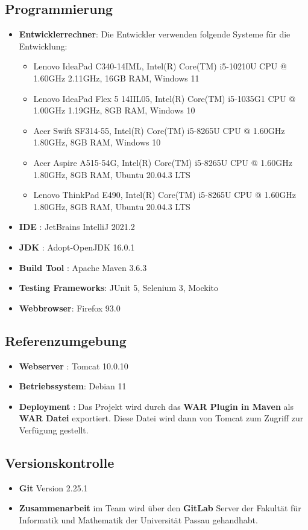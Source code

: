 \subsection{Programmierung}
\begin{itemize}
	\item \textbf{Entwicklerrechner}: Die Entwickler verwenden folgende Systeme für die Entwicklung:
		\begin{itemize}
			\item Lenovo IdeaPad C340-14IML, Intel(R) Core(TM) i5-10210U CPU @ 1.60GHz 2.11GHz, 16GB RAM, Windows 11
			\item Lenovo IdeaPad Flex 5 14IIL05, Intel(R) Core(TM) i5-1035G1 CPU @ 1.00GHz 1.19GHz, 8GB RAM, Windows 10
			\item Acer Swift SF314-55, Intel(R) Core(TM) i5-8265U CPU @ 1.60GHz 1.80GHz, 8GB RAM, Windows 10
			\item Acer Aspire A515-54G, Intel(R) Core(TM) i5-8265U CPU @ 1.60GHz 1.80GHz, 8GB RAM, Ubuntu 20.04.3 LTS
			\item Lenovo ThinkPad E490, Intel(R) Core(TM) i5-8265U CPU @ 1.60GHz 1.80GHz, 8GB RAM, Ubuntu 20.04.3 LTS
		\end{itemize}
	\item \textbf{IDE }: JetBrains IntelliJ 2021.2
	\item \textbf{JDK }: Adopt-OpenJDK 16.0.1
	\item \textbf{Build Tool }: Apache Maven 3.6.3
	\item \textbf{Testing Frameworks}: JUnit 5, Selenium 3, Mockito
	\item \textbf{Webbrowser}: Firefox 93.0
\end{itemize}
\subsection{Referenzumgebung}
\begin{itemize}
	\item \textbf{Webserver }: Tomcat 10.0.10
	\item \textbf{Betriebssystem}: Debian 11
	\item \textbf{Deployment }: Das Projekt wird durch das \textbf{WAR Plugin in Maven} als \textbf{WAR Datei } exportiert. Diese Datei wird dann von Tomcat zum Zugriff zur Verfügung gestellt.
\end{itemize}
\subsection{Versionskontrolle}
\begin{itemize}
	\item \textbf{Git} Version 2.25.1
	\item \textbf{Zusammenarbeit} im Team wird über den \textbf{GitLab } Server der Fakultät für Informatik und Mathematik der Universität Passau gehandhabt.
\end{itemize}
